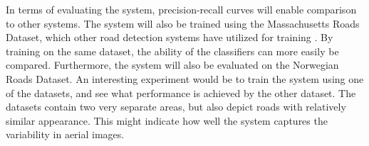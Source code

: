 In terms of evaluating the system, precision-recall curves will enable comparison to other systems. The system will also be trained using the Massachusetts Roads Dataset, which other road detection systems have utilized for training \citep{MnihThesis}\citep{saito_building_and_roads}. By training on the same dataset, the ability of the classifiers can more easily be compared. Furthermore, the system will also be evaluated on the Norwegian Roads Dataset. An interesting experiment would be to train the system using one of the datasets, and see what performance is achieved by the other dataset. The datasets contain two very separate areas, but also depict roads with relatively similar appearance. This might indicate how well the system captures the variability in aerial images. \\

